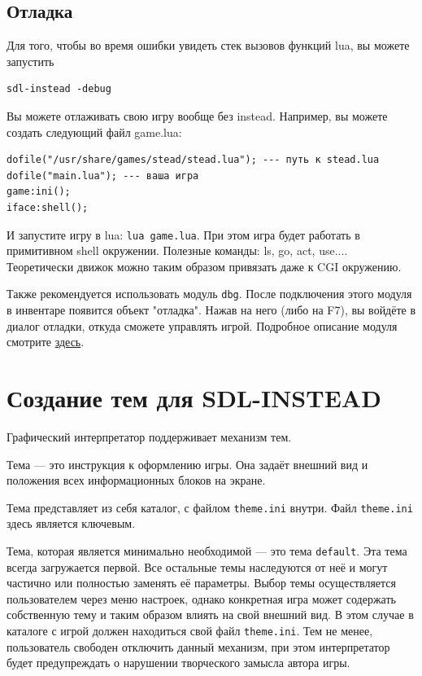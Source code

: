 \documentclass[a4paper,12pt]{article}
\begin{document}
\subsection{Отладка}
Для того, чтобы во время ошибки увидеть стек вызовов функций lua, вы можете запустить

\begin{verbatim}
sdl-instead -debug
\end{verbatim}

Вы можете отлаживать свою игру вообще без instead. Например, вы можете создать следующий файл game.lua:

\begin{verbatim}
dofile("/usr/share/games/stead/stead.lua"); --- путь к stead.lua
dofile("main.lua"); --- ваша игра
game:ini();
iface:shell();
\end{verbatim}

И запустите игру в lua: \verb/lua game.lua/. При этом игра будет работать в примитивном shell окружении. Полезные команды: ls, go, act, use.... Теоретически движок можно таким образом привязать даже к CGI окружению.

Также рекомендуется использовать модуль \verb/dbg/. После подключения этого модуля в инвентаре появится объект "отладка". Нажав на него (либо на F7), вы войдёте в диалог отладки, откуда сможете управлять игрой. Подробное описание модуля смотрите \href{http://instead.pinebrush.com/wiki/ru/gamedev/modules/dbg}{здесь}.

\section{Создание тем для SDL-INSTEAD}

Графический интерпретатор поддерживает механизм тем.

Тема --- это инструкция к оформлению игры. Она задаёт внешний вид и положения всех информационных блоков на экране.

Тема представляет из себя каталог, с файлом \verb/theme.ini/ внутри. Файл \verb/theme.ini/ здесь является ключевым.

Тема, которая является минимально необходимой --- это тема \verb/default/. Эта тема всегда загружается первой. Все остальные темы наследуются от неё и могут частично или полностью заменять её параметры. Выбор темы осуществляется пользователем через меню настроек, однако конкретная игра может содержать собственную тему и таким образом влиять на свой внешний вид. В этом случае в каталоге с игрой должен находиться свой файл \verb/theme.ini/. Тем не менее, пользователь свободен отключить данный механизм, при этом интерпретатор будет предупреждать о нарушении творческого замысла автора игры.
\end{document}
